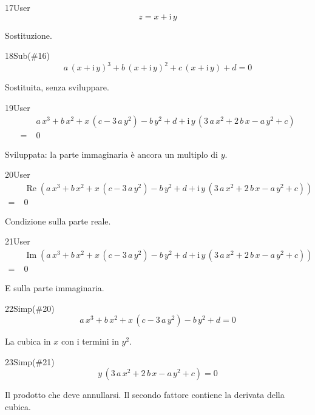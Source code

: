 \begin{espr}{17}{User}{}
\[
z = x + \mathrm{i}\, y
\]
\end{espr}
Sostituzione.

\begin{espr}{18}{Sub(\#16)}{}
\[
a\, \left(x + \mathrm{i}\, y\right)^{3} + b\, \left(x + \mathrm{i}\, y\right)^{2} + c\, \left(x + \mathrm{i}\, y\right) + d = 0
\]
\end{espr}
Sostituita, senza sviluppare.

\begin{espr}{19}{User}{}
\begin{align*}
& a\, x^{3} + b\, x^{2} + x\, \left(c - 3\, a\, y^{2}\right) - b\, y^{2} + d + \mathrm{i}\, y\, \left(3\, a\, x^{2} + 2\, b\, x - a\, y^{2} + c\right) \\
=\;& 0
\end{align*}
\end{espr}
Sviluppata: la parte immaginaria è ancora un multiplo di $y$.

\begin{espr}{20}{User}{}
\begin{align*}
& \operatorname{Re}\!\left(a\, x^{3} + b\, x^{2} + x\, \left(c - 3\, a\, y^{2}\right) - b\, y^{2} + d + \mathrm{i}\, y\, \left(3\, a\, x^{2} + 2\, b\, x - a\, y^{2} + c\right)\right) \\
=\;& 0
\end{align*}
\end{espr}
Condizione sulla parte reale.

\begin{espr}{21}{User}{}
\begin{align*}
& \operatorname{Im}\!\left(a\, x^{3} + b\, x^{2} + x\, \left(c - 3\, a\, y^{2}\right) - b\, y^{2} + d + \mathrm{i}\, y\, \left(3\, a\, x^{2} + 2\, b\, x - a\, y^{2} + c\right)\right) \\
=\;& 0
\end{align*}
\end{espr}
E sulla parte immaginaria.

\begin{espr}{22}{Simp(\#20)}{}
\[
a\, x^{3} + b\, x^{2} + x\, \left(c - 3\, a\, y^{2}\right) - b\, y^{2} + d = 0
\]
\end{espr}
La cubica in $x$ con i termini in $y^2$.

\begin{espr}{23}{Simp(\#21)}{}
\[
y\, \left(3\, a\, x^{2} + 2\, b\, x - a\, y^{2} + c\right) = 0
\]
\end{espr}
Il prodotto che deve annullarsi. Il secondo fattore contiene la derivata della cubica.

